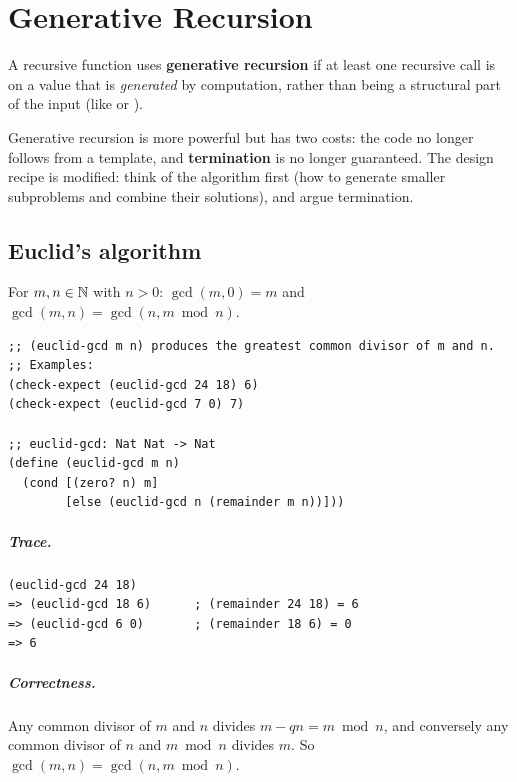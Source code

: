 \chapter{Generative Recursion}\label{ch:generative}

\begin{definition}
A recursive function uses \textbf{generative recursion} if at least one
recursive call is on a value that is \emph{generated} by computation, rather
than being a structural part of the input (like  or
).
\end{definition}

Generative recursion is more powerful but has two costs: the code no longer
follows from a template, and \textbf{termination} is no longer guaranteed.
The design recipe is modified: think of the algorithm first (how to generate
smaller subproblems and combine their solutions), and argue termination.

\section{Euclid's algorithm}
For $m, n \in \mathbb{N}$ with $n > 0$: $\gcd(m, 0) = m$ and
$\gcd(m, n) = \gcd(n, m \bmod n)$.

\begin{lstlisting}[style=racket]
;; (euclid-gcd m n) produces the greatest common divisor of m and n.
;; Examples:
(check-expect (euclid-gcd 24 18) 6)
(check-expect (euclid-gcd 7 0) 7)

;; euclid-gcd: Nat Nat -> Nat
(define (euclid-gcd m n)
  (cond [(zero? n) m]
        [else (euclid-gcd n (remainder m n))]))
\end{lstlisting}

\paragraph{Trace.}
\begin{lstlisting}[style=racket]
(euclid-gcd 24 18)
=> (euclid-gcd 18 6)      ; (remainder 24 18) = 6
=> (euclid-gcd 6 0)       ; (remainder 18 6) = 0
=> 6
\end{lstlisting}

\paragraph{Correctness.} Any common divisor of $m$ and $n$ divides
$m - qn = m \bmod n$, and conversely any common divisor of $n$ and $m \bmod n$
divides $m$. So $\gcd(m,n) = \gcd(n, m \bmod n)$.

